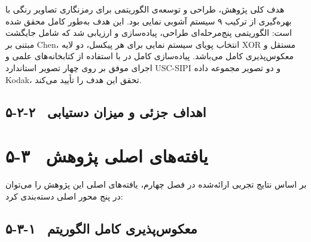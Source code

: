 هدف کلی پژوهش، طراحی و توسعه‌ی الگوریتمی برای رمزنگاری تصاویر رنگی با بهره‌گیری از ترکیب ۹ سیستم آشوبی نمایی بود. این هدف به‌طور کامل محقق شده است: الگوریتمی پنج‌مرحله‌ای طراحی، پیاده‌سازی و ارزیابی شد که شامل جایگشت مبتنی بر ‎Chen‎، انتخاب پویای سیستم نمایی برای هر پیکسل، دو لایه ‎XOR‎ مستقل و معکوس‌پذیری کامل می‌باشد. پیاده‌سازی کامل در \pyver{} با استفاده از کتابخانه‌های علمی و اجرای موفق بر روی چهار تصویر استاندارد ‎USC-SIPI‎ و دو تصویر مجموعه داده ‎Kodak‎، تحقق این هدف را تأیید می‌کند.

\subsection{۵-۲-۲  اهداف جزئی و میزان دستیابی}

\begin{table}[h]
\centering
\footnotesize
{}
\caption{ارزیابی میزان تحقق اهداف جزئی پژوهش}
\end{table}

\section{۵-۳  یافته‌های اصلی پژوهش}

بر اساس نتایج تجربی ارائه‌شده در فصل چهارم، یافته‌های اصلی این پژوهش را می‌توان در پنج محور اصلی دسته‌بندی کرد:

\subsection{۵-۳-۱  معکوس‌پذیری کامل الگوریتم}

